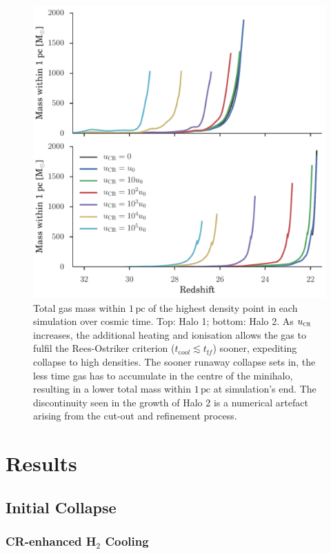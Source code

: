 \documentclass{thesis}
\newcommand{\pc}{\ensuremath{\,\mathrm{pc}}\xspace}
\newcommand{\ucr}{\ensuremath{{u}_{\textsc{cr}}}\xspace}
\begin{document}
\begin{figure}
\begin{center}
\includegraphics[width=.95\columnwidth]{figures/collapse/collapse}
\caption{\label{fig:collapse}
Total gas mass within $1\pc$ of the highest density point in each simulation over cosmic time.
Top: Halo 1; bottom: Halo 2.
As $\ucr$ increases, the additional heating and ionisation allows the gas to fulfil the Rees-Ostriker criterion ($t_{\mathrm cool} \lesssim t_{\mathrm ff}$) sooner, expediting collapse to high densities.  
The sooner runaway collapse sets in, the less time gas has to accumulate in the centre of the minihalo, resulting in a lower total mass within $1\pc$ at simulation's end.
The discontinuity seen in the growth of Halo 2 is a numerical artefact arising from the cut-out and refinement process.%
}
\end{center}
\end{figure}

\section{Results}
\label{sec:results}
\subsection{Initial Collapse}
\subsubsection{CR-enhanced H$_2$ Cooling}
\label{sec:initial_collapse}
\end{document}
